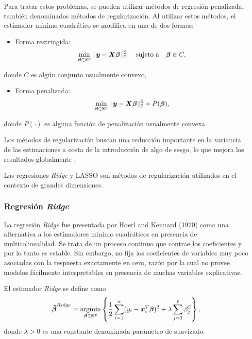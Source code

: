 \documentclass[a4paper,12pt]{article}
\begin{document}
Para tratar estos problemas, se pueden utilizar métodos de regresión penalizada, también denominados métodos de regularización. Al utilizar estos métodos, el estimador mínimo cuadrático se modifica en una de dos formas:
\begin{itemize}
\item Forma restringida:
\begin{equation}
\operatornamewithlimits{min}\limits_{\boldsymbol{\beta} \in \mathbb{R}^p} ||\boldsymbol{y}-\boldsymbol{X}\boldsymbol{\beta} ||_2^2 \text{ } \text{ } \text{ } \text{ sujeto a } \text{ } \text{ } \boldsymbol{\beta} \in C,
\end{equation}
\end{itemize}
donde $C$ es algún conjunto usualmente convexo,
\begin{itemize}
\item Forma penalizada:
\begin{equation}
\operatornamewithlimits{min}\limits_{\boldsymbol{\beta} \in \mathbb{R}^p} ||\boldsymbol{y}-\boldsymbol{X}\boldsymbol{\beta} ||_2^2 + P(\boldsymbol{\beta}),
\end{equation}
\end{itemize}
donde $P(\cdot)$ es alguna función de penalización usualmente convexa.

Los métodos de regularización buscan una reducción importante en la variancia de las estimaciones a costa de la introducción de algo de sesgo, lo que mejora los resultados globalmente \citep{buhlmann2011statistics}.

Las regresiones \textit{Ridge} y LASSO son métodos de regularización utilizados en el contexto de grandes dimensiones.

\subsubsection*{Regresión \textit{Ridge}}
La regresión \textit{Ridge} fue presentada por Hoerl and Kennard (1970) como una alternativa a los estimadores mínimo cuadráticos en presencia de multicolinealidad. Se trata de un proceso continuo que contrae los coeficientes y por lo tanto es estable. Sin embargo, no fija los coeficientes de variables muy poco asociadas con la respuesta exactamente en cero, razón por la cual no provee modelos fácilmente interpretables en presencia de muchas variables explicativas.

El estimador \textit{Ridge} se define como
\begin{equation}
\label{BETA_Ridge}
\boldsymbol{\hat{\beta}}^{Ridge}=\operatornamewithlimits{argmin}\limits_{\boldsymbol{\beta} \in \mathbb{R}^p} \left\{ \frac{1}{2} \sum_{i=1}^n (y_i-\boldsymbol{x}_i^T\boldsymbol{\beta})^2+\lambda \sum_{j=1}^p \beta_j^2 \right\},
\end{equation}
donde $\lambda > 0$ es una constante denominada parámetro de suavizado.
 
\end{document}
